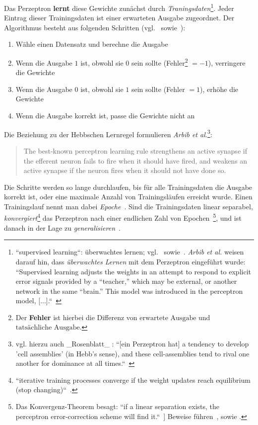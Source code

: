Das Perzeptron \textbf{lernt} diese Gewichte zunächst durch \textit{Traningsdaten}\footnote{
    ``supervised learning``: überwachtes lernen; vgl.~\cite[811]{RN09} sowie~\cite[15]{Fau94}. \textit{Arbib et al.} weisen darauf hin, dass \textit{überwachtes Lernen} mit dem Perzeptron eingeführt wurde: ``Supervised learning adjusts the weights in an attempt to respond to explicit error signals provided by a “teacher,” which may be external, or another network in the same “brain.” This model was introduced in the perceptron model, [...].``~\cite[30]{Arb03}
}.
Jeder Eintrag dieser Trainingsdaten ist einer erwarteten Ausgabe zugeordnet. Der Algorithmus besteht aus folgenden Schritten (vgl.~\cite[65]{RM87} sowie~\cite[842]{RN09}):



\begin{enumerate}
    \item Wähle einen Datensatz und berechne die Ausgabe
    \item Wenn die Ausgabe $1$ ist, obwohl sie $0$ sein sollte (Fehler\footnote{
    Der \textbf{Fehler} ist hierbei die Differenz von $\text{erwartete Ausgabe}$ und $\text{tatsächliche Ausgabe}$.
    } $=-1$), verringere die Gewichte
    \item Wenn die Ausgabe $0$ ist, obwohl sie $1$ sein sollte  (Fehler $=1$), erhöhe die Gewichte
    \item Wenn die Ausgabe korrekt ist, passe die Gewichte nicht an
\end{enumerate}

\noindent
Die Beziehung zu der Hebbschen Lernregel formulieren \textit{Arbib et al.}\footnote{
    vgl. hierzu auch _Rosenblatt_ : ``[ein Perzeptron hat] a tendency to develop 'cell assemblies' (in Hebb's sense), and these cell-assemblies tend to rival one another for dominance at all times.``~\cite[464]{Ros62}
}:

\blockquote[{\cite[20]{Arb03}}]{
    The best-known perceptron learning rule strengthens an active synapse if the efferent neuron fails to fire when it should have fired, and weakens an active synapse if the neuron fires when it should not have done so.
}

\noindent
Die Schritte werden so lange durchlaufen, bis für alle Trainingsdaten die Ausgabe korrekt ist, oder eine maximale Anzahl von Trainingsläufen erreicht wurde.
Einen Trainingslauf nennt man dabei \textit{Epoche}~\cite[436]{Fau94}.
Sind die Trainingsdaten linear separabel, \textit{konvergiert}\footnote{
    ``iterative training processes converge if the weight updates reach equilibrium (stop changing)``~\cite[425 ``Convergence``]{Fau94}.
} das Perzeptron nach einer endlichen Zahl von Epochen~\cite[164]{MP88}\footnote{
    Das Konvergenz-Theorem besagt: ``if a linear separation exists, the perceptron error-correction scheme will find it.``~\cite[20]{Arb03}] Beweise führen~\cite[111 ff.]{Ros62}, \cite[168 ff.]{MP88} sowie \cite{Nov62}.
}, und ist danach in der Lage zu \textit{generalisieren}~\cite[202]{Ert21a}.\\

